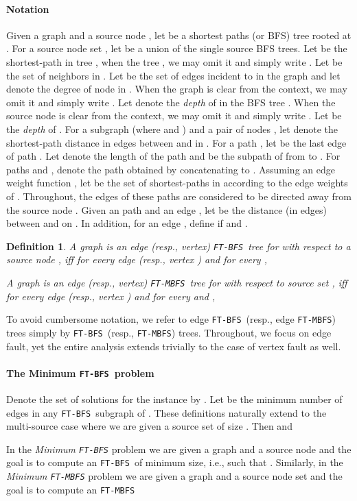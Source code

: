 \documentclass[12pt]{article}
\newtheorem{definition}[theorem]{Definition}
\def\FTMBFS{\mbox{\tt FT-MBFS}}
\def\FTBFS{\mbox{\tt FT-BFS}}
\begin{document}
\paragraph{Notation}
Given a graph  and a source node , let  be
a shortest paths (or BFS) tree rooted at . For a source node set ,
let  be a union of the single source BFS trees.
Let  be the  shortest-path in tree , when the tree , we may omit it and simply write .
Let  be the set of  neighbors in . Let  be the set of edges incident to 
in the graph  and let  denote the degree of node  in . When the graph  is clear from the context,
we may omit it and simply write .
Let  denote the {\em depth} of 
in the BFS tree . When the source node  is clear from the context,
we may omit it and simply write .
Let  be the {\em depth}
of .
For a subgraph 
(where  and )
and a pair of nodes , let  denote the
shortest-path distance in edges between  and  in .
For a path , let  be the last edge of path . Let  denote the length of the path and  be the subpath of  from  to . For paths  and ,  denote the path obtained by concatenating  to . Assuming an edge weight function , let  be the set of  shortest-paths in  according to the edge weights of .  Throughout, the edges of these paths are considered to be directed away from the source node . Given an  path  and an edge , let  be the distance (in edges) between  and  on . In addition, for an edge , define  if  and .
\begin{definition}
A graph  is an edge (resp., vertex) \FTBFS\ tree for  with respect to a source node , iff for every edge  (resp., vertex ) and for every ,

\par
A graph  is an edge (resp., vertex) \FTMBFS\ tree for  with respect to source set , iff for every edge  (resp., vertex ) and for every  and ,

\end{definition}
To avoid cumbersome notation, we refer to
edge \FTBFS\ (resp., edge \FTMBFS) trees simply by \FTBFS\ (resp., \FTMBFS) trees. Throughout, we focus on edge fault, yet the entire analysis extends trivially to the case of vertex fault as well.

\paragraph{The Minimum \FTBFS\ problem}
Denote the set of solutions for the instance  by
.
Let 
be the minimum number of edges in any \FTBFS\ subgraph of .
These definitions naturally extend to the multi-source case where we are
given a source set  of size .
Then 
and 
\par In the \emph{Minimum \FTBFS} problem we are given a graph  and a
source node  and the goal is to compute an \FTBFS\ 
of minimum size, i.e., such that .
Similarly, in the \emph{Minimum \FTMBFS} problem we are given a graph  and a
source node set  and the goal is to compute an \FTMBFS\
\end{document}

